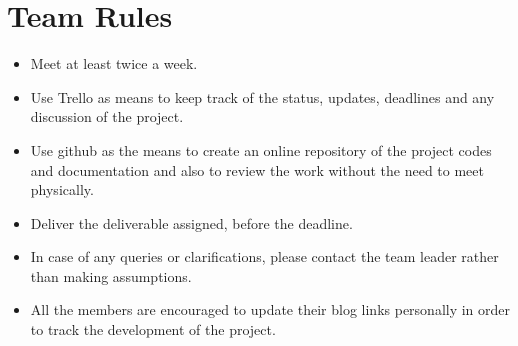 \documentclass{article}
\begin{document}
\section{Team Rules}
\begin{itemize}
    \item Meet at least twice a week.
    \item Use Trello as means to keep track of the status, updates, deadlines and any discussion of the project.
    \item Use github as the means to create an online repository of the project codes and documentation and also to review the work without the need to meet physically.
    \item Deliver the deliverable assigned, before the deadline.
    \item In case of any queries or clarifications, please contact the team leader rather than making assumptions.
    \item All the members are encouraged to update their blog links personally in order to track the development of the project.
\end{itemize}
\end{document}
